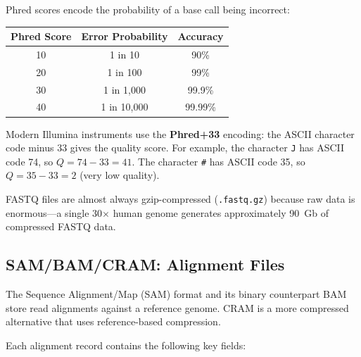 \begin{keyconcept}[title={Phred Quality Scores}]
Phred scores encode the probability of a base call being incorrect:

\begin{center}
\begin{tabular}{ccc}
\toprule
\textbf{Phred Score} & \textbf{Error Probability} & \textbf{Accuracy} \\
\midrule
10 & 1 in 10 & 90\% \\
20 & 1 in 100 & 99\% \\
30 & 1 in 1,000 & 99.9\% \\
40 & 1 in 10,000 & 99.99\% \\
\bottomrule
\end{tabular}
\end{center}

Modern Illumina instruments use the \textbf{Phred+33} encoding: the ASCII character code minus 33 gives the quality score. For example, the character \texttt{J} has ASCII code 74, so $Q = 74 - 33 = 41$. The character \texttt{\#} has ASCII code 35, so $Q = 35 - 33 = 2$ (very low quality).
\end{keyconcept}

FASTQ files are almost always gzip-compressed (\texttt{.fastq.gz}) because raw data is enormous---a single 30$\times$ human genome generates approximately 90~Gb of compressed FASTQ data.

\subsection{SAM/BAM/CRAM: Alignment Files}
\label{subsec:bioinf:sambam}

The Sequence Alignment/Map (SAM) format and its binary counterpart BAM store read alignments against a reference genome. CRAM is a more compressed alternative that uses reference-based compression.

Each alignment record contains the following key fields:


